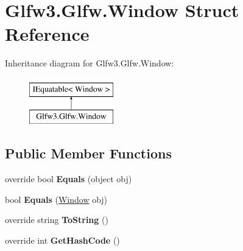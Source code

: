 \hypertarget{struct_glfw3_1_1_glfw_1_1_window}{}\section{Glfw3.\+Glfw.\+Window Struct Reference}
\label{struct_glfw3_1_1_glfw_1_1_window}


 


Inheritance diagram for Glfw3.\+Glfw.\+Window\+:\begin{figure}[H]
\begin{center}
\leavevmode
\includegraphics[height=2.000000cm]{struct_glfw3_1_1_glfw_1_1_window}
\end{center}
\end{figure}
\subsection*{Public Member Functions}
\begin{DoxyCompactItemize}
\item 
\mbox{\label{struct_glfw3_1_1_glfw_1_1_window_ac6225df55c6be89fe7d865e7e5ad2432}} 
override bool {\bfseries Equals} (object obj)
\item 
\mbox{\label{struct_glfw3_1_1_glfw_1_1_window_ab371b7c6f2adc28989037043d88c1022}} 
bool {\bfseries Equals} (\mbox{\hyperlink{struct_glfw3_1_1_glfw_1_1_window}{Window}} obj)
\item 
\mbox{\label{struct_glfw3_1_1_glfw_1_1_window_a1563cbfd0561f8ba064f56c686ecf527}} 
override string {\bfseries To\+String} ()
\item 
\mbox{\label{struct_glfw3_1_1_glfw_1_1_window_a1c798779084be194779ca2162aea8450}} 
override int {\bfseries Get\+Hash\+Code} ()
\end{DoxyCompactItemize}

